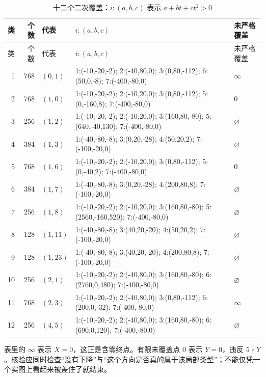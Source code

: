 \begin{longtable}{r r l p{83mm} p{24mm}}
\caption{十二个二次覆盖：$i:(a,b,c)$ 表示 $a+bt+ct^2>0$}\label{tab:ten-data}\\
\toprule 类&个数&代表&$i:(a,b,c)$&未严格覆盖\\\midrule\endfirsthead
\toprule 类&个数&代表&$i:(a,b,c)$&未严格覆盖\\\midrule\endhead
1&768&$(0,1)$&1:(-10,-20,-2); 2:(-40,80,0); 3:(0,80,-112); 6:(50,0,-8); 7:(-400,-80,0)&$\infty$\\
2&768&$(1,0)$&1:(-10,-20,-2); 2:(-10,20,0); 3:(0,80,-112); 5:(0,-160,8); 7:(-400,-80,0)&0\\
3&256&$(1,2)$&1:(-10,-20,-2); 2:(-10,20,0); 3:(160,80,-80); 5:(640,-40,130); 7:(-400,-80,0)&$\varnothing$\\
4&384&$(1,3)$&1:(-40,-80,-8); 3:(0,20,-28); 4:(50,20,2); 7:(-100,-20,0)&$\varnothing$\\
5&768&$(1,6)$&1:(-10,-20,-2); 2:(-10,20,0); 3:(0,80,-112); 5:(0,-40,2); 7:(-400,-80,0)&0\\
6&384&$(1,7)$&1:(-40,-80,-8); 3:(0,20,-28); 4:(200,80,8); 7:(-100,-20,0)&$\varnothing$\\
7&256&$(1,8)$&1:(-10,-20,-2); 2:(-10,20,0); 3:(160,80,-80); 5:(2560,-160,520); 7:(-400,-80,0)&$\varnothing$\\
8&128&$(1,11)$&1:(-40,-80,-8); 3:(40,20,-20); 4:(50,20,2); 7:(-100,-20,0)&$\varnothing$\\
9&128&$(1,23)$&1:(-40,-80,-8); 3:(40,20,-20); 4:(200,80,8); 7:(-100,-20,0)&$\varnothing$\\
10&256&$(2,1)$&1:(-10,-20,-2); 2:(-40,80,0); 3:(160,80,-80); 6:(2760,0,480); 7:(-400,-80,0)&$\varnothing$\\
11&768&$(2,3)$&1:(-10,-20,-2); 2:(-40,80,0); 3:(0,80,-112); 6:(200,0,-32); 7:(-400,-80,0)&$\infty$\\
12&256&$(4,5)$&1:(-10,-20,-2); 2:(-40,80,0); 3:(160,80,-80); 6:(690,0,120); 7:(-400,-80,0)&$\varnothing$\\
\bottomrule\end{longtable}
\endgroup
表里的 $\infty$ 表示 $X=0$，这正是含零终点。有限未覆盖点 $0$ 表示 $Y=0$，违反 $5\nmid Y$。核验应同时检查“没有下降”与“这个方向是否真的属于该局部类型”；不能仅凭一个实图上看起来被盖住了就结束。
